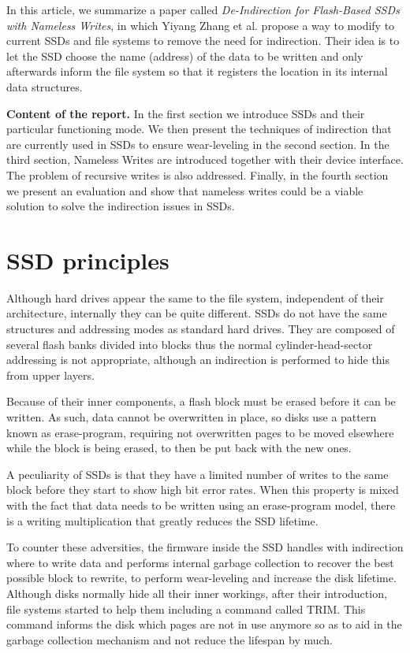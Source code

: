 \documentclass[twocolumn,a4paper,10pt]{article}
\begin{document}
In this article, we summarize a paper called \textit{De-Indirection for
	Flash-Based SSDs with Nameless Writes}, in which Yiyang Zhang et al.
propose a way to modify to current SSDs and file systems to remove the need
for indirection. Their idea is to let the SSD choose the name (address) of the
data to be written and only afterwards inform the file system so that it
registers the location in its internal data structures.

\noindent
\textbf{Content of the report.} In the first section we introduce SSDs and their
particular functioning mode. We then present the techniques of indirection
that are currently used in SSDs to ensure wear-leveling in the second section.
In the third section, Nameless Writes are introduced together with their
device interface. The problem of recursive writes is also addressed.
Finally, in the fourth section we present an evaluation and show that nameless
writes could be a viable solution to solve the indirection issues in SSDs.

\section*{SSD principles}
Although hard drives appear the same to the file system, independent of their
architecture, internally they can be quite different. SSDs do not have
the same structures and addressing modes as standard hard drives. They are
composed of several flash banks divided into blocks thus the normal
cylinder-head-sector addressing is not appropriate, although an indirection is
performed to hide this from upper layers.

Because of their inner components, a flash block must be erased before it can
be written. As such, data cannot be overwritten in place, so disks use a
pattern known as erase-program, requiring not overwritten pages to be moved
elsewhere while the block is being erased, to then be put back with the new
ones.

A peculiarity of SSDs is that they have a limited number of writes to the same
block before they start to show high bit error rates. When this property is
mixed with the fact that data needs to be written using an erase-program
model, there is a writing multiplication that greatly reduces the SSD
lifetime.

To counter these adversities, the firmware inside the SSD handles with
indirection where to write data and performs internal garbage collection to
recover the best possible block to rewrite, to perform wear-leveling and
increase the disk lifetime. Although disks normally hide all their inner
workings, after their introduction, file systems started to help them
including a command called TRIM. This command informs the disk which pages are
not in use anymore so as to aid in the garbage collection mechanism and not
reduce the lifespan by much.
\end{document}

